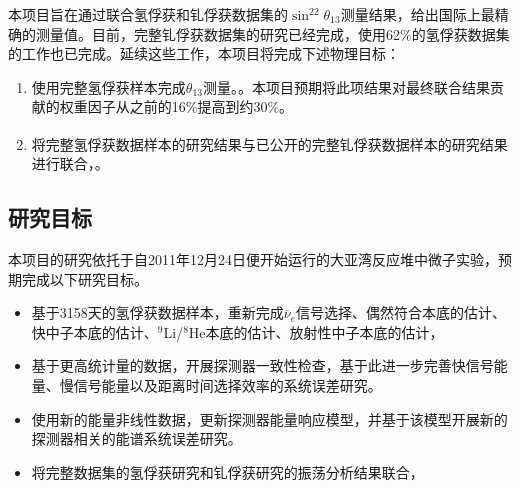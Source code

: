 \documentclass[a4paper,zihao=-4]{article}
\newcommand{\citess}[1]{\textsuperscript{\cite{#1}}}
\begin{document}
本项目旨在通过联合氢俘获和钆俘获数据集的$\sin^22\theta_{13}$测量结果，给出国际上最精确的测量值。目前，完整钆俘获数据集的研究已经完成，使用62\%的氢俘获数据集的工作也已完成。延续这些工作，本项目将完成下述物理目标：
\begin{enumerate}
	\item 使用完整氢俘获样本完成$\theta_{13}$测量。。本项目预期将此项结果对最终联合结果贡献的权重因子从之前的16\%提高到约30\%。
	\item 将完整氢俘获数据样本的研究结果与已公开的完整钆俘获数据样本的研究结果\citess{DayaBay:2022orm}进行联合，。
\end{enumerate}

\begin{spacing}{1.3} %
	 \songti   
	
	  
	\vspace{11bp}
\end{spacing}


\subsection{研究目标}
本项目的研究依托于自2011年12月24日便开始运行的大亚湾反应堆中微子实验，预期完成以下研究目标。
\begin{itemize}
	\item {} 基于3158天的氢俘获数据样本，重新完成$\overline{\nu}_e$信号选择、偶然符合本底的估计、快中子本底的估计、$^9$Li/$^8$He本底的估计、放射性中子本底的估计，
	\item {}基于更高统计量的数据，开展探测器一致性检查，基于此进一步完善快信号能量、慢信号能量以及距离时间选择效率的系统误差研究。
	\item {}使用新的能量非线性数据，更新探测器能量响应模型，并基于该模型开展新的探测器相关的能谱系统误差研究。
	\item {}将完整数据集的氢俘获研究和钆俘获研究的振荡分析结果联合，
\end{itemize}
\end{document}
